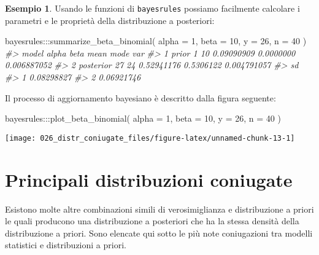 \documentclass[
]{memoir}
\newenvironment{Shaded}{\begin{snugshade}}{\end{snugshade}}
\newcommand{\AttributeTok}[1]{\textcolor[rgb]{0.77,0.63,0.00}{#1}}
\newcommand{\CommentTok}[1]{\textcolor[rgb]{0.56,0.35,0.01}{\textit{#1}}}
\newcommand{\DecValTok}[1]{\textcolor[rgb]{0.00,0.00,0.81}{#1}}
\newcommand{\FunctionTok}[1]{\textcolor[rgb]{0.00,0.00,0.00}{#1}}
\newcommand{\NormalTok}[1]{#1}
\newcommand{\SpecialCharTok}[1]{\textcolor[rgb]{0.00,0.00,0.00}{#1}}
\theoremstyle{definition}
\theoremstyle{definition}
\newtheorem{example}{Esempio}[chapter]
\theoremstyle{definition}
\theoremstyle{definition}
\theoremstyle{remark}
\begin{document}
\begin{example}
Usando le funzioni di \texttt{bayesrules} possiamo facilmente calcolare i parametri e le proprietà della distribuzione a posteriori:

\begin{Shaded}
\begin{Highlighting}[]
\NormalTok{bayesrules}\SpecialCharTok{:::}\FunctionTok{summarize\_beta\_binomial}\NormalTok{(}
  \AttributeTok{alpha =} \DecValTok{1}\NormalTok{, }\AttributeTok{beta =} \DecValTok{10}\NormalTok{, }\AttributeTok{y =} \DecValTok{26}\NormalTok{, }\AttributeTok{n =} \DecValTok{40}
\NormalTok{)}
\CommentTok{\#\textgreater{}       model alpha beta       mean      mode         var}
\CommentTok{\#\textgreater{} 1     prior     1   10 0.09090909 0.0000000 0.006887052}
\CommentTok{\#\textgreater{} 2 posterior    27   24 0.52941176 0.5306122 0.004791057}
\CommentTok{\#\textgreater{}           sd}
\CommentTok{\#\textgreater{} 1 0.08298827}
\CommentTok{\#\textgreater{} 2 0.06921746}
\end{Highlighting}
\end{Shaded}

Il processo di aggiornamento bayesiano è descritto dalla figura seguente:

\begin{Shaded}
\begin{Highlighting}[]
\NormalTok{bayesrules}\SpecialCharTok{:::}\FunctionTok{plot\_beta\_binomial}\NormalTok{(}
  \AttributeTok{alpha =} \DecValTok{1}\NormalTok{, }\AttributeTok{beta =} \DecValTok{10}\NormalTok{, }\AttributeTok{y =} \DecValTok{26}\NormalTok{, }\AttributeTok{n =} \DecValTok{40}
\NormalTok{)}
\end{Highlighting}
\end{Shaded}

\begin{center}\texttt{[image: 026\_distr\_coniugate\_files/figure-latex/unnamed-chunk-13-1]} \end{center}

\end{example}

\hypertarget{principali-distribuzioni-coniugate}{%
\section{Principali distribuzioni coniugate}\label{principali-distribuzioni-coniugate}}

Esistono molte altre combinazioni simili di verosimiglianza e distribuzione a priori le quali producono una distribuzione a posteriori che ha la stessa densità della distribuzione a priori. Sono elencate qui sotto le più note coniugazioni tra modelli statistici e distribuzioni a priori.
\end{document}
